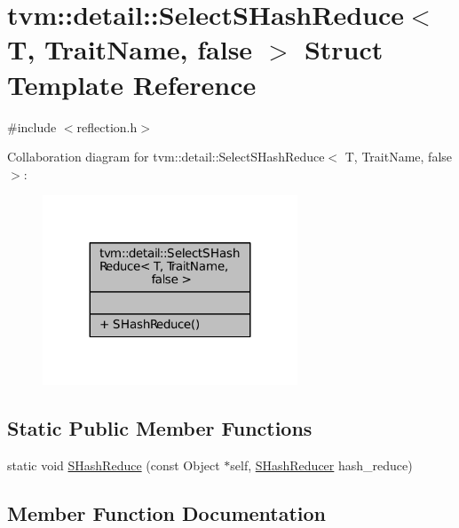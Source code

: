 \hypertarget{structtvm_1_1detail_1_1SelectSHashReduce_3_01T_00_01TraitName_00_01false_01_4}{}\section{tvm\+:\+:detail\+:\+:Select\+S\+Hash\+Reduce$<$ T, Trait\+Name, false $>$ Struct Template Reference}
\label{structtvm_1_1detail_1_1SelectSHashReduce_3_01T_00_01TraitName_00_01false_01_4}


{\ttfamily \#include $<$reflection.\+h$>$}



Collaboration diagram for tvm\+:\+:detail\+:\+:Select\+S\+Hash\+Reduce$<$ T, Trait\+Name, false $>$\+:
\nopagebreak
\begin{figure}[H]
\begin{center}
\leavevmode
\includegraphics[width=215pt]{structtvm_1_1detail_1_1SelectSHashReduce_3_01T_00_01TraitName_00_01false_01_4__coll__graph}
\end{center}
\end{figure}
\subsection*{Static Public Member Functions}
\begin{DoxyCompactItemize}
\item 
static void \hyperlink{structtvm_1_1detail_1_1SelectSHashReduce_3_01T_00_01TraitName_00_01false_01_4_afb43357d733c91a227fdf0cc4221b6d9}{S\+Hash\+Reduce} (const Object $\ast$self, \hyperlink{classtvm_1_1SHashReducer}{S\+Hash\+Reducer} hash\+\_\+reduce)
\end{DoxyCompactItemize}


\subsection{Member Function Documentation}
